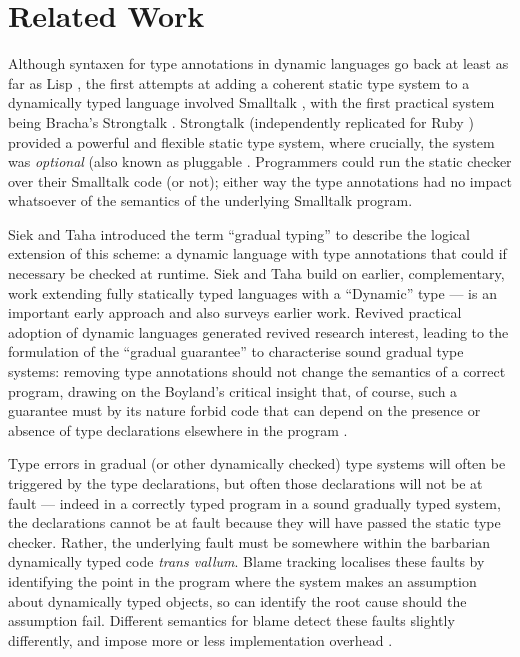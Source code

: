 
\section{Related Work}
\label{sec:related-work}

Although syntaxen for type annotations in dynamic languages go back at
least as far as Lisp \cite{cltl2}, the first attempts at adding a
coherent static type system to a dynamically typed language involved
Smalltalk \cite{RalphJohnson1986}, with the first practical system
being Bracha's Strongtalk \cite{Strongtalk1}. Strongtalk
(independently replicated for Ruby \cite{DiamondBackRuby}) provided a
powerful and flexible static type system, where crucially, the system
was \emph{optional} (also known as pluggable
\cite{BrachaPluggable2004}. Programmers could run the static checker
over their Smalltalk code (or not); either way the type annotations
had no impact whatsoever of the semantics of the underlying Smalltalk
program.

Siek and Taha introduced the term ``gradual typing''
\cite{seikTaha2006} to describe the logical extension of this scheme: a
dynamic language with type annotations that could if necessary be
checked at runtime. Siek and Taha build on earlier, complementary,
work extending fully statically typed languages with a ``Dynamic''
type --- \cite{AbadiTOPLAS1991} is an important early approach
and also surveys earlier work. Revived practical adoption of dynamic
languages generated revived research interest, leading to the
formulation of the ``gradual guarantee''
\cite{gradualGuarantee,revisedGradualGuarantee} to characterise sound
gradual type systems: removing type annotations should not change the
semantics of a correct program, drawing on the Boyland's critical
insight that, of course, such a guarantee must by its nature forbid
code that can depend on the presence or absence of type declarations 
elsewhere in the program \cite{BoylandFOOLBeingMeanAboutGrace}. 

Type errors in gradual (or other dynamically checked) type systems will
often be triggered by the type declarations, but often those
declarations will not be at fault --- indeed in a correctly typed
program in a sound gradually typed system,  the declarations cannot be
at fault because they will have passed the static type
checker. Rather, the underlying fault must be somewhere within the
barbarian dynamically typed code \emph{trans vallum}.  Blame tracking
\cite{blame,blameyblame,blame} localises these faults by identifying
the point in the program where the system makes an 
assumption about dynamically typed objects, so can identify the root
cause should the assumption fail.  Different semantics for blame
detect these faults slightly differently, and impose more or less
implementation overhead \cite{Vitousek2017,moreBLameStuff}.

